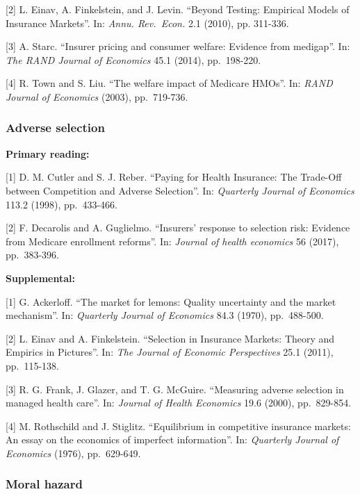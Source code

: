 \documentclass[11pt,]{article}
\begin{document}
{[}2{]} L. Einav, A. Finkelstein, and J. Levin. ``Beyond Testing:
Empirical Models of Insurance Markets''. In: \emph{Annu. Rev.~Econ.} 2.1
(2010), pp. 311-336.

{[}3{]} A. Starc. ``Insurer pricing and consumer welfare: Evidence from
medigap''. In: \emph{The RAND Journal of Economics} 45.1 (2014),
pp.~198-220.

{[}4{]} R. Town and S. Liu. ``The welfare impact of Medicare HMOs''. In:
\emph{RAND Journal of Economics} (2003), pp.~719-736.

\hypertarget{adverse-selection}{%
\subsubsection{Adverse selection}\label{adverse-selection}}

\textbf{Primary reading:}

{[}1{]} D. M. Cutler and S. J. Reber. ``Paying for Health Insurance: The
Trade-Off between Competition and Adverse Selection''. In:
\emph{Quarterly Journal of Economics} 113.2 (1998), pp.~433-466.

{[}2{]} F. Decarolis and A. Guglielmo. ``Insurers' response to selection
risk: Evidence from Medicare enrollment reforms''. In: \emph{Journal of
health economics} 56 (2017), pp.~383-396.

\textbf{Supplemental:}

{[}1{]} G. Ackerloff. ``The market for lemons: Quality uncertainty and
the market mechanism''. In: \emph{Quarterly Journal of Economics} 84.3
(1970), pp.~488-500.

{[}2{]} L. Einav and A. Finkelstein. ``Selection in Insurance Markets:
Theory and Empirics in Pictures''. In: \emph{The Journal of Economic
Perspectives} 25.1 (2011), pp.~115-138.

{[}3{]} R. G. Frank, J. Glazer, and T. G. McGuire. ``Measuring adverse
selection in managed health care''. In: \emph{Journal of Health
Economics} 19.6 (2000), pp.~829-854.

{[}4{]} M. Rothschild and J. Stiglitz. ``Equilibrium in competitive
insurance markets: An essay on the economics of imperfect information''.
In: \emph{Quarterly Journal of Economics} (1976), pp.~629-649.

\hypertarget{moral-hazard}{%
\subsubsection{Moral hazard}\label{moral-hazard}}
\end{document}
